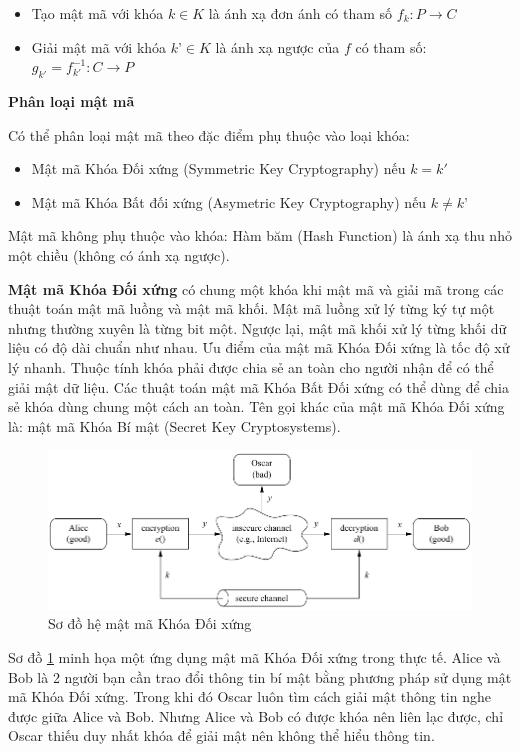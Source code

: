 \begin{itemize}
\item Tạo mật mã với khóa $k \in K $ là ánh xạ đơn ánh có tham số $f_k: P \to C$
\item Giải mật mã với khóa $k’ \in K $ là ánh xạ ngược của $f$ có tham số: $ g_{k'} = f_{k'}^{-1} : C \to P $
\end{itemize}

\textbf{Phân loại mật mã}

Có thể phân loại mật mã theo đặc điểm phụ thuộc vào loại khóa:

\begin{itemize}
\item Mật mã Khóa Đối xứng (Symmetric Key Cryptography) nếu $k=k'$
\item Mật mã Khóa Bất đối xứng (Asymetric Key Cryptography) nếu $k ≠ k’$
\end{itemize}

Mật mã không phụ thuộc vào khóa: Hàm băm (Hash Function) là ánh xạ thu nhỏ một chiều (không có ánh xạ ngược).

\textbf{Mật mã Khóa Đối xứng} có chung một khóa khi mật mã và giải mã trong các thuật toán mật mã luồng và mật mã khối. Mật mã luồng xử lý từng ký tự một nhưng thường xuyên là từng bit một. Ngược lại, mật mã khối xử lý từng khối dữ liệu có độ dài chuẩn như nhau. Ưu điểm của mật mã Khóa Đối xứng là tốc độ xử lý nhanh. Thuộc tính khóa phải được chia sẻ an toàn cho người nhận để có thể giải mật dữ liệu. Các thuật toán mật mã Khóa Bất Đối xứng có thể dùng để chia sẻ khóa dùng chung một cách an toàn. Tên gọi khác của mật mã Khóa Đối xứng là: mật mã Khóa Bí mật (Secret Key Cryptosystems).

\begin{figure}[htbp]
\centering
\includegraphics[width=.9\linewidth]{img/sym_alg.png}
\caption{Sơ đồ hệ mật mã Khóa Đối xứng}
\label{fig:sym_alg}
\end{figure}

Sơ đồ \ref{fig:sym_alg} minh họa một ứng dụng mật mã Khóa Đối xứng trong thực tế. Alice và Bob là 2 người bạn cần trao đổi thông tin bí mật bằng phương pháp sử dụng mật mã Khóa Đối xứng. Trong khi đó Oscar luôn tìm cách giải mật thông tin nghe được giữa Alice và Bob. Nhưng Alice và Bob có được khóa nên liên lạc được, chỉ Oscar thiếu duy nhất khóa để giải mật nên không thể hiểu thông tin.

